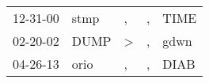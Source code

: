 \begin{supertabular}{lllll}
 12-31-00 &  stmp &             , &  , &  TIME \\
 02-20-02 &  DUMP &  \textgreater &  , &  gdwn \\
 04-26-13 &  orio &             , &  , &  DIAB \\
\end{supertabular}
